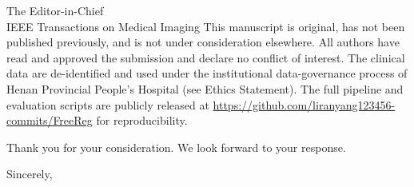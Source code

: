 \documentclass[11pt]{letter}
\begin{document}
\begin{letter}{The Editor-in-Chief\\IEEE Transactions on Medical Imaging}
This manuscript is original, has not been published previously, and is not under
consideration elsewhere. All authors have read and approved the submission and
declare no conflict of interest. The clinical data are de-identified and used
under the institutional data-governance process of Henan Provincial People's
Hospital (see Ethics Statement). The full pipeline and evaluation scripts are
publicly released at \url{https://github.com/liranyang123456-commits/FreeReg}
for reproducibility.

Thank you for your consideration. We look forward to your response.

\closing{Sincerely,}
\end{letter}
\end{document}
